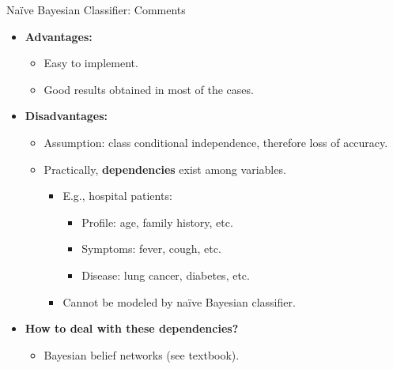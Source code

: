 \begin{frame}{Naïve Bayesian Classifier: Comments}
  \begin{itemize}
  \item \textbf{Advantages:}
    \begin{itemize}
    \item Easy to implement.
    \item Good results obtained in most of the cases.
    \end{itemize}
  \item \textbf{Disadvantages:}
    \begin{itemize}
    \item Assumption: class conditional independence, therefore loss of accuracy.
    \item Practically, \textbf{dependencies} exist among variables.
      \begin{itemize}
      \item E.g., hospital patients:
        \begin{itemize}
        \item Profile: age, family history, etc.
        \item Symptoms: fever, cough, etc.
        \item Disease: lung cancer, diabetes, etc.
        \end{itemize}
      \item Cannot be modeled by naïve Bayesian classifier.
      \end{itemize}
    \end{itemize}
  \item \textbf{How to deal with these dependencies?}
    \begin{itemize}
    \item Bayesian belief networks (see textbook).
    \end{itemize}
  \end{itemize}
\end{frame}
